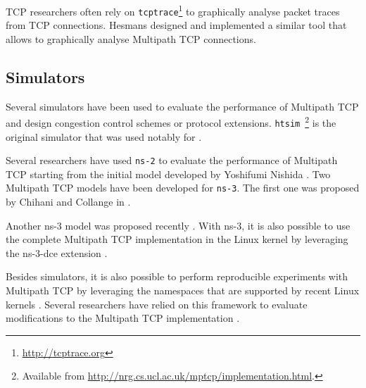 TCP researchers often rely on \texttt{tcptrace}\footnote{\url{http://tcptrace.org}} to graphically analyse packet traces from TCP connections. Hesmans designed and implemented a similar tool \cite{Hesmans_Tracing:2014} that allows to graphically analyse Multipath TCP connections.  



\subsection{Simulators}

Several simulators have been used to evaluate the performance of Multipath TCP and design congestion control schemes or protocol extensions. \texttt{htsim}~\footnote{Available from \url{http://nrg.cs.ucl.ac.uk/mptcp/implementation.html}.} is the original simulator that was used notably for \cite{Wischik_Design:2011,Raiciu_Datacenter:2011}.

Several researchers have used \texttt{ns-2} to evaluate the performance of Multipath TCP starting from the initial model developed by Yoshifumi Nishida \cite{mptcp_ns2}. Two Multipath TCP models have been developed for \texttt{ns-3}. The first one was proposed by Chihani and Collange in \cite{Chihani_mptcp:2011}. 

Another ns-3 model was proposed recently \cite{Kheirkhah_mptcp:2014}. With ns-3, it is also possible to use the complete Multipath TCP implementation in the Linux kernel by leveraging the ns-3-dce extension \cite{Tazaki_dce:2013}.

Besides simulators, it is also possible to perform reproducible experiments with Multipath TCP by leveraging the namespaces that are supported by recent Linux kernels \cite{Handigol_mininet:2012}. Several researchers have relied on this framework to evaluate modifications to the Multipath TCP implementation \cite{Paasch_schedulers:2014,Paasch_Experimental:2013}. 




